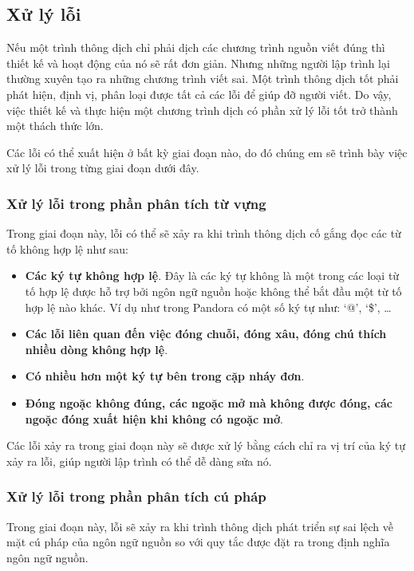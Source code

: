 \subsection{Xử lý lỗi}
Nếu một trình thông dịch chỉ phải dịch các chương trình nguồn viết đúng thì thiết kế và hoạt động của nó sẽ rất đơn giản. Nhưng những người lập trình lại thường xuyên tạo ra những chương trình viết sai. Một trình thông dịch tốt phải phát hiện, định vị, phân loại được tất cả các lỗi để giúp đỡ người viết. Do vậy, việc thiết kế và thực hiện một chương trình dịch có phần xử lý lỗi tốt trở thành một thách thức lớn.

Các lỗi có thể xuất hiện ở bất kỳ giai đoạn nào, do đó chúng em sẽ trình bày việc xử lý lỗi trong từng giai đoạn dưới đây.

\subsubsection{Xử lý lỗi trong phần phân tích từ vựng}
Trong giai đoạn này, lỗi có thể sẽ xảy ra khi trình thông dịch cố gắng đọc các từ tố không hợp lệ như sau:

\begin{itemize}
    \item \textbf{Các ký tự không hợp lệ}. Đây là các ký tự không là một trong các loại từ tố hợp lệ được hỗ trợ bởi ngôn ngữ nguồn hoặc không thể bắt đầu một từ tố hợp lệ nào khác. Ví dụ như trong Pandora có một số ký tự như: `@', `\$', \dots 
    \item \textbf{Các lỗi liên quan đến việc đóng chuỗi, đóng xâu, đóng chú thích nhiều dòng không hợp lệ}. 
    \item \textbf{Có nhiều hơn một ký tự bên trong cặp nháy đơn}.
    \item \textbf{Đóng ngoặc không đúng, các ngoặc mở mà không được đóng, các ngoặc đóng xuất hiện khi không có ngoặc mở}.
\end{itemize}

Các lỗi xảy ra trong giai đoạn này sẽ được xử lý bằng cách chỉ ra vị trí của ký tự xảy ra lỗi, giúp người lập trình có thể dễ dàng sửa nó.

\subsubsection{Xử lý lỗi trong phần phân tích cú pháp}
Trong giai đoạn này, lỗi sẽ xảy ra khi trình thông dịch phát triển sự sai lệch về mặt cú pháp của ngôn ngữ nguồn so với quy tắc được đặt ra trong định nghĩa ngôn ngữ nguồn.

